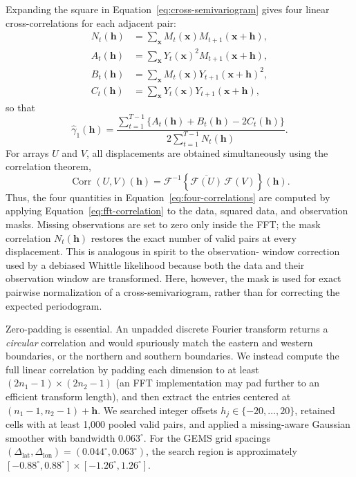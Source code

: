 Expanding the square in Equation~\eqref{eq:cross-semivariogram} gives four
linear cross-correlations for each adjacent pair:
\begin{align}
 N_t(\boldsymbol h)
   &=\sum_{\boldsymbol x}M_t(\boldsymbol x)
      M_{t+1}(\boldsymbol x+\boldsymbol h), \\
 A_t(\boldsymbol h)
   &=\sum_{\boldsymbol x}Y_t(\boldsymbol x)^2
      M_{t+1}(\boldsymbol x+\boldsymbol h), \\
 B_t(\boldsymbol h)
   &=\sum_{\boldsymbol x}M_t(\boldsymbol x)
      Y_{t+1}(\boldsymbol x+\boldsymbol h)^2, \\
 C_t(\boldsymbol h)
   &=\sum_{\boldsymbol x}Y_t(\boldsymbol x)
      Y_{t+1}(\boldsymbol x+\boldsymbol h),
 \label{eq:four-correlations}
\end{align}
so that
\begin{equation}
 \widehat\gamma_1(\boldsymbol h)
 =\frac{\sum_{t=1}^{T-1}
 \{A_t(\boldsymbol h)+B_t(\boldsymbol h)-2C_t(\boldsymbol h)\}}
 {2\sum_{t=1}^{T-1}N_t(\boldsymbol h)}.
 \label{eq:masked-gamma}
\end{equation}
For arrays $U$ and $V$, all displacements are obtained simultaneously using
the correlation theorem,
\begin{equation}
 \operatorname{Corr}(U,V)(\boldsymbol h)
 =\mathcal F^{-1}
 \left\{\overline{\mathcal F(U)}\,\mathcal F(V)\right\}
 (\boldsymbol h).
 \label{eq:fft-correlation}
\end{equation}
Thus, the four quantities in Equation~\eqref{eq:four-correlations} are computed
by applying Equation~\eqref{eq:fft-correlation} to the data, squared data, and
observation masks.  Missing observations are set to zero only inside the FFT;
the mask correlation $N_t(\boldsymbol h)$ restores the exact number of valid
pairs at every displacement.  This is analogous in spirit to the observation-
window correction used by a debiased Whittle likelihood because both the data
and their observation window are transformed.  Here, however, the mask is used
for exact pairwise normalization of a cross-semivariogram, rather than for
correcting the expected periodogram.

Zero-padding is essential.  An unpadded discrete Fourier transform returns a
\emph{circular} correlation and would spuriously match the eastern and western
boundaries, or the northern and southern boundaries.  We instead compute the
full linear correlation by padding each dimension to at least
$(2n_1-1)\times(2n_2-1)$ (an FFT implementation may pad further to an efficient
transform length), and then extract the entries centered at
$(n_1-1,n_2-1)+\boldsymbol h$.  We searched integer offsets
$h_j\in\{-20,\ldots,20\}$, retained cells with at least 1,000 pooled valid
pairs, and applied a missing-aware Gaussian smoother with bandwidth
$0.063^\circ$.  For the GEMS grid spacings
$(\Delta_{\mathrm{lat}},\Delta_{\mathrm{lon}})=(0.044^\circ,0.063^\circ)$,
the search region is approximately
$[-0.88^\circ,0.88^\circ]\times[-1.26^\circ,1.26^\circ]$.

